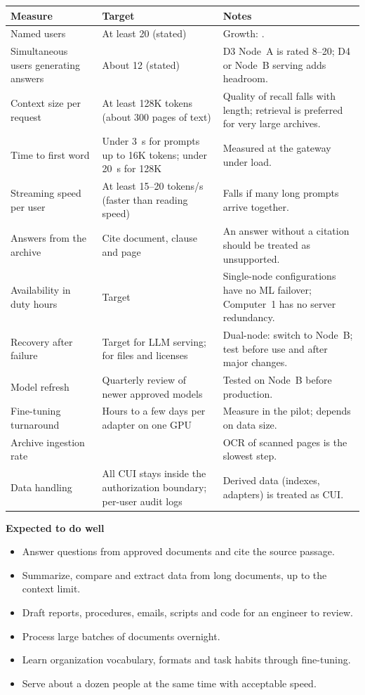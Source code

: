 {\footnotesize
\begin{xltabular}{\textwidth}{@{}Y{1.0} Y{0.9} Y{1.1}@{}}
  \toprule
  Measure & Target & Notes \\
  \midrule
  \endhead
  Named users & At least 20 (stated) & Growth: . \\
  Simultaneous users generating answers & About 12 (stated) & D3 Node~A is rated 8--20; D4 or Node~B serving adds headroom. \\
  Context size per request & At least 128K tokens (about 300 pages of text) & Quality of recall falls with length; retrieval is preferred for very large archives. \\
  Time to first word & Under 3~s for prompts up to 16K tokens; under 20~s for 128K & Measured at the gateway under load. \\
  Streaming speed per user & At least 15--20 tokens/s (faster than reading speed) & Falls if many long prompts arrive together. \\
  Answers from the archive & Cite document, clause and page & An answer without a citation should be treated as unsupported. \\
  Availability in duty hours & Target  & Single-node configurations have no ML failover; Computer~1 has no server redundancy. \\
  Recovery after failure & Target  for LLM serving;  for files and licenses & Dual-node: switch to Node~B; test before use and after major changes. \\
  Model refresh & Quarterly review of newer approved models & Tested on Node~B before production. \\
  Fine-tuning turnaround & Hours to a few days per adapter on one GPU & Measure in the pilot; depends on data size. \\
  Archive ingestion rate &  & OCR of scanned pages is the slowest step. \\
  Data handling & All CUI stays inside the authorization boundary; per-user audit logs & Derived data (indexes, adapters) is treated as CUI. \\
  \bottomrule
\end{xltabular}}


\textbf{Expected to do well}
\begin{itemize}
  \item Answer questions from approved documents and cite the source passage.
  \item Summarize, compare and extract data from long documents, up to the context limit.
  \item Draft reports, procedures, emails, scripts and code for an engineer to review.
  \item Process large batches of documents overnight.
  \item Learn organization vocabulary, formats and task habits through fine-tuning.
  \item Serve about a dozen people at the same time with acceptable speed.
\end{itemize}

